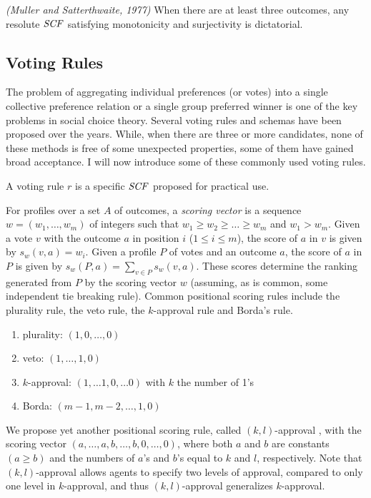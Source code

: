 \begin{thm}
\label{thm:Mull_Satt}
\emph{(Muller and Satterthwaite, 1977)}
	When there are at least three outcomes,
	any resolute $\it{SCF}$ satisfying monotonicity and surjectivity is dictatorial.
\end{thm}



\subsection{Voting Rules}
The problem of aggregating individual preferences (or votes) into a single
collective preference relation or a single group preferred winner is
one of the key problems in social choice theory.
Several voting rules and schemas have been proposed over the years.
While, when there are three or more candidates, none of these
methods is free of some unexpected properties,
some of them have gained broad acceptance.
I will now introduce some of these commonly used voting rules.

\begin{definition}
	A voting rule $r$ is a specific $\it{SCF}$ proposed for practical use.
\end{definition}

For profiles over a set $A$ of outcomes, 
a \emph{scoring vector} is a sequence $w= (w_1,\ldots,
w_m)$ of integers such that $w_1\geq w_2 \geq \ldots \geq w_m$
and $w_1 > w_m$. Given a vote
$v$ with the outcome $a$ in position $i$ ($1 \leq i \leq m$), 
the score of $a$ in
$v$ is given
by $s_w(v,a)=w_i$. Given a profile $P$ of votes and an outcome $a$,
the score of $a$ in $P$ is given by $s_w(P,a) = \sum_{v\in P} s_w(v,a)$. 
These scores determine the ranking generated from $P$ by the scoring
vector $w$ (assuming, as is common, some independent tie breaking rule). 
Common positional scoring rules include the plurality rule,
the veto rule, the $k$-approval rule and Borda's rule.
\begin{enumerate} \itemsep -4pt
	\item plurality: $(1,0,\ldots,0)$
	\item veto: $(1,\ldots,1,0)$
	\item $k$-approval: $(1,\ldots 1,0,\ldots 0)$ with $k$ the number of 1's
	\item Borda: $(m-1,m-2,\ldots, 1,0)$
\end{enumerate}

We propose yet another positional scoring rule, called $(k,l)$-approval \cite{LiuT},
with the scoring vector $(a,\ldots,a,b,\ldots,b,0,\ldots,0)$, where
both $a$ and $b$ are constants $(a \geq b)$ and the numbers of $a$'s and $b$'s equal to
$k$ and $l$, respectively.
Note that $(k,l)$-approval allows agents to specify two levels of approval,
compared to only one level in $k$-approval, and thus $(k,l)$-approval
generalizes $k$-approval.


